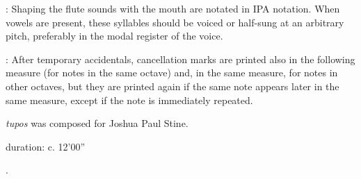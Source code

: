 \documentclass[11pt]{article}
\begin{document}
\begin{multicols}{2}
\vspace*{0.25cm}


 : Shaping the flute sounds with the mouth are notated in IPA notation. When vowels are present, these syllables should be voiced or half-sung at an arbitrary pitch, preferably in the modal register of the voice. \\
\rightskip\leftskip
\phantom{text} \hfill \phantom{()}

\vspace*{0.25cm}


 : After temporary accidentals, cancellation marks are printed also in the following measure (for notes in the same octave) and, in the same measure, for notes in other octaves, but they are printed again if the same note appears later in the same measure, except if the note is immediately repeated. \\
\rightskip\leftskip
\phantom{text} \hfill \phantom{()}

\end{multicols}

\vspace*{20\baselineskip}

\begin{center}
\textit{tupos} was composed for Joshua Paul Stine.
\end{center}

\vspace*{15\baselineskip}

\begin{center}
duration: c. 12'00''
\end{center}

.
\end{document}
